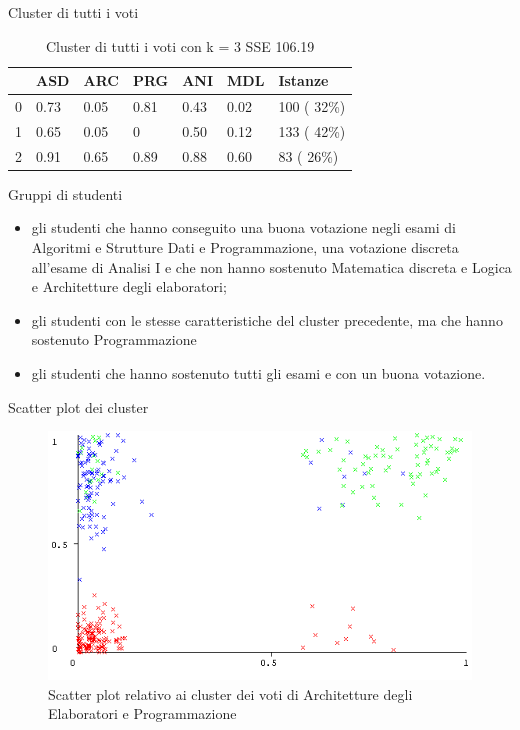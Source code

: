 \documentclass{beamer}
\begin{document}
\begin{frame}{Cluster di tutti i voti}
  \begin{table}[ht]
    \centering
    \begin{tabular}{@{}lllllll@{}}
    \toprule
      & ASD  & ARC  & PRG & ANI  & MDL  & Istanze      \\ \midrule
    0 & 0.73 & 0.05 & 0.81& 0.43 & 0.02 &  100  ( 32\%)\\
    1 & 0.65 & 0.05 & 0   & 0.50 & 0.12 &  133 ( 42\%) \\
    2 & 0.91 & 0.65 & 0.89& 0.88 & 0.60 &  83  ( 26\%) \\ \bottomrule
    \end{tabular}
    \caption{Cluster di tutti i voti con k = 3 SSE 106.19}
    \label{c3V}
  \end{table}
\end{frame}

\begin{frame}{Gruppi di studenti}
  \begin{itemize}
    \item gli studenti che hanno conseguito una buona votazione negli esami di Algoritmi e Strutture Dati e Programmazione,
    una votazione dis\-creta all'esame di Analisi I e che non hanno sostenuto Matematica discreta e Logica e Architetture degli elaboratori;
    \item gli studenti con le stesse caratteristiche del cluster precedente, ma che hanno sostenuto Programmazione
    \item gli studenti che hanno sostenuto tutti gli esami e con un buona vota\-zione.
  \end{itemize}
\end{frame}

\begin{frame}{Scatter plot dei cluster}
  \begin{figure}[bt]
    \includegraphics[width=\textwidth]{../img/ARC-PRG-Cluster.png}
    \caption{Scatter plot relativo ai cluster dei voti di Architetture degli Elaboratori e Programmazione}
  \end{figure}
\end{frame}
\end{document}
